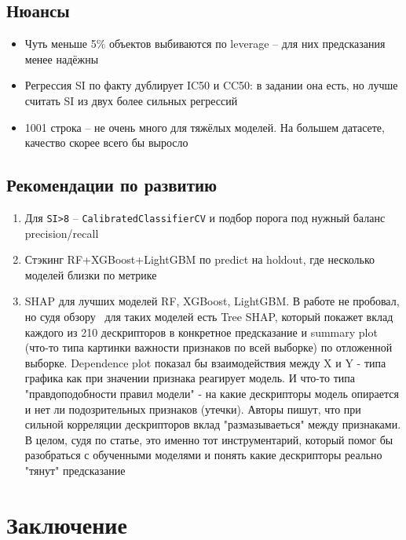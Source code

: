 \documentclass[12pt,a4paper]{report}
\begin{document}
\section{Нюансы}

\begin{itemize}
    \item Чуть меньше 5\% объектов выбиваются по leverage -- для них предсказания менее надёжны
    \item Регрессия SI по факту дублирует IC50 и CC50: в задании она есть, но лучше считать SI из двух более сильных регрессий
    \item 1001 строка -- не очень много для тяжёлых моделей. На большем датасете, качество скорее всего бы выросло
\end{itemize}

\section{Рекомендации по развитию}

\begin{enumerate}
    \item Для \texttt{SI>8} -- \texttt{CalibratedClassifierCV} и подбор порога под нужный баланс precision/recall
    \item Стэкинг RF+XGBoost+LightGBM по predict на holdout, где несколько моделей близки по метрике
    \item SHAP для лучших моделей RF, XGBoost, LightGBM. В работе не пробовал, но судя обзору~\cite{habr-shap-lime} для таких моделей есть Tree SHAP, который покажет вклад каждого из 210 дескрипторов в конкретное предсказание и summary plot (что-то типа картинки важности признаков по всей выборке) по отложенной выборке. Dependence plot показал бы взаимодействия между X и Y - типа графика как при значении признака реагирует модель. И что-то типа "правдоподобности правил модели" - на какие дескрипторы модель опирается и нет ли подозрительных признаков (утечки). Авторы пишут, что при сильной корреляции дескрипторов вклад "размазываеться" между признаками. В целом, судя по статье, это именно тот инструментарий, который помог бы разобраться с обученными моделями и понять какие дескрипторы реально "тянут" предсказание 
\end{enumerate}

\chapter*{Заключение}
\end{document}
